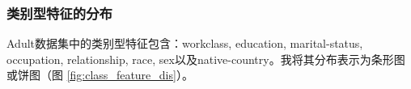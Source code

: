 \documentclass[12pt,a4paper]{article}
\theoremstyle{definition}
\begin{document}
\subsubsection{类别型特征的分布}

Adult数据集中的类别型特征包含：workclass, education, marital-status, occupation, relationship, race, sex以及native-country。我将其分布表示为条形图或饼图（图 \ref{fig:class_feature_dis}）。

\begin{figure}[H]
	\centering
	\subfigure[relationship]{
}
\end{figure}
\end{document}
